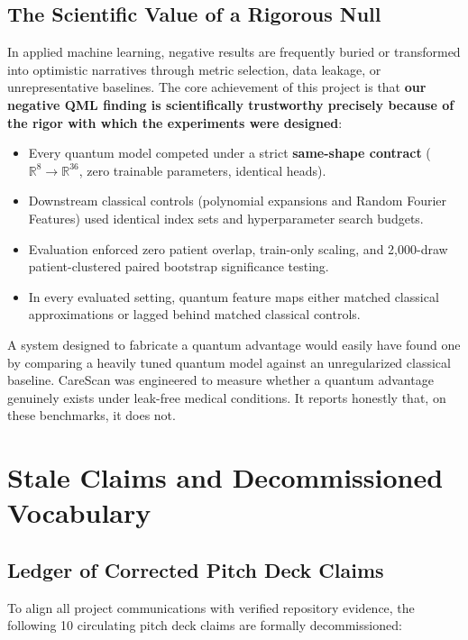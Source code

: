 \documentclass[11pt,a4paper]{report}
\begin{document}
\section{The Scientific Value of a Rigorous Null}
In applied machine learning, negative results are frequently buried or transformed into optimistic narratives through metric selection, data leakage, or unrepresentative baselines. The core achievement of this project is that \textbf{our negative QML finding is scientifically trustworthy precisely because of the rigor with which the experiments were designed}:
\begin{itemize}
  \item Every quantum model competed under a strict \textbf{same-shape contract} ($\mathbb{R}^8 \to \mathbb{R}^{36}$, zero trainable parameters, identical heads).
  \item Downstream classical controls (polynomial expansions and Random Fourier Features) used identical index sets and hyperparameter search budgets.
  \item Evaluation enforced zero patient overlap, train-only scaling, and 2,000-draw patient-clustered paired bootstrap significance testing.
  \item In every evaluated setting, quantum feature maps either matched classical approximations or lagged behind matched classical controls.
\end{itemize}

A system designed to fabricate a quantum advantage would easily have found one by comparing a heavily tuned quantum model against an unregularized classical baseline. CareScan was engineered to measure whether a quantum advantage genuinely exists under leak-free medical conditions. It reports honestly that, on these benchmarks, it does not.




\appendix

\chapter{Stale Claims and Decommissioned Vocabulary}

\section{Ledger of Corrected Pitch Deck Claims}
To align all project communications with verified repository evidence, the following 10 circulating pitch deck claims are formally decommissioned:
\end{document}
